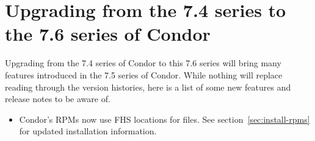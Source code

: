 \section{\label{sec:gotchas}Upgrading from the 7.4 series to the 7.6 series of Condor}

Upgrading from the 7.4 series of Condor to this 7.6 series will
bring many features introduced in the 7.5 series of Condor.
While nothing will replace reading through the version histories,
here is a list of some new features and release notes to
be aware of.

\begin{itemize}

\item  Condor's RPMs now use FHS locations for files.
See section~\ref{sec:install-rpms} for updated installation information. 

\end{itemize}

